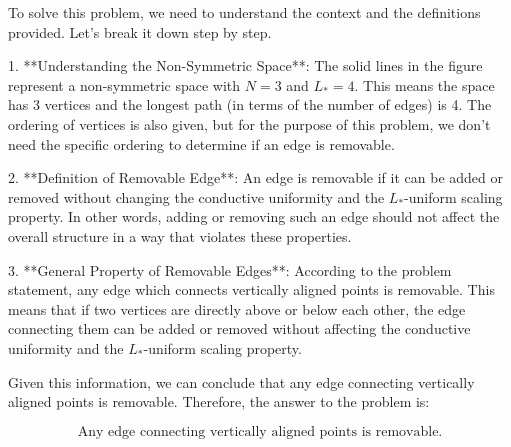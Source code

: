 To solve this problem, we need to understand the context and the definitions provided. Let's break it down step by step.

1. **Understanding the Non-Symmetric Space**: The solid lines in the figure represent a non-symmetric space with \( N = 3 \) and \( L_* = 4 \). This means the space has 3 vertices and the longest path (in terms of the number of edges) is 4. The ordering of vertices is also given, but for the purpose of this problem, we don't need the specific ordering to determine if an edge is removable.

2. **Definition of Removable Edge**: An edge is removable if it can be added or removed without changing the conductive uniformity and the \( L_* \)-uniform scaling property. In other words, adding or removing such an edge should not affect the overall structure in a way that violates these properties.

3. **General Property of Removable Edges**: According to the problem statement, any edge which connects vertically aligned points is removable. This means that if two vertices are directly above or below each other, the edge connecting them can be added or removed without affecting the conductive uniformity and the \( L_* \)-uniform scaling property.

Given this information, we can conclude that any edge connecting vertically aligned points is removable. Therefore, the answer to the problem is:

\[
\boxed{\text{Any edge connecting vertically aligned points is removable.}}
\]